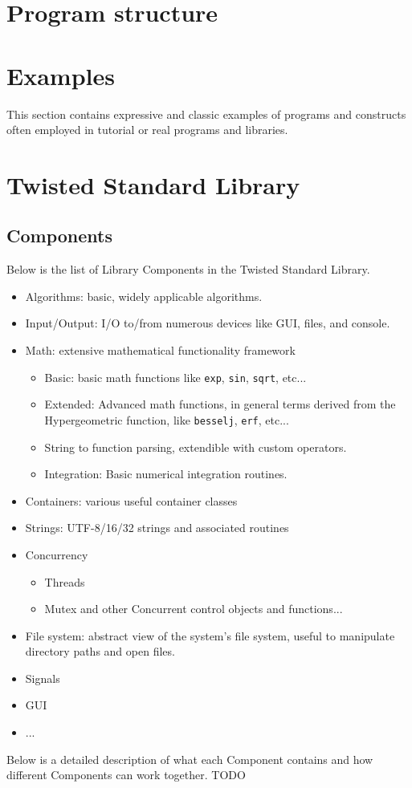 \documentclass[a4paper,11pt]{article}
\newcommand{\tcode}[1]{\texttt{#1}}
\begin{document}
\section{Program structure}


\section{Examples}
This section contains expressive and classic examples of programs and constructs often employed in tutorial or real programs and libraries.

\section{Twisted Standard Library}
  \subsection{Components}

Below is the list of Library Components in the Twisted Standard Library.
\begin{itemize}
  \item Algorithms: basic, widely applicable algorithms.
  \item Input/Output: I/O to/from numerous devices like GUI, files, and console.
  \item Math: extensive mathematical functionality framework
  \begin{itemize}
    \item Basic: basic math functions like \tcode{exp}, \tcode{sin}, \tcode{sqrt}, etc...
    \item Extended: Advanced math functions, in general terms derived from the Hypergeometric function, like \tcode{besselj}, \tcode{erf}, etc...
    \item String to function parsing, extendible with custom operators.
    \item Integration: Basic numerical integration routines.
  \end{itemize}
  \item Containers: various useful container classes
  \item Strings: UTF-8/16/32 strings and associated routines
  \item Concurrency
  \begin{itemize}
    \item Threads
    \item Mutex and other Concurrent control objects and functions...
  \end{itemize}
  \item File system: abstract view of the system's file system, useful to manipulate directory paths and open files.
  \item Signals
  \item GUI
  \item ...
\end{itemize}
Below is a detailed description of what each Component contains and how different Components can work together.
TODO
\end{document}
